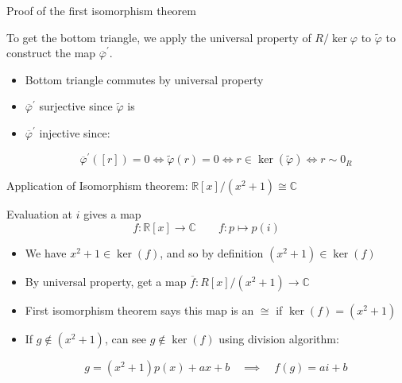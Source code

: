 \documentclass{beamer}
\newcommand{\C}{\mathbb{C}}
\newcommand{\R}{\mathbb{R}}
\begin{document}
\begin{frame}[fragile]{Proof of the first isomorphism theorem}
\begin{center}
\end{center}
To get the bottom triangle, we apply the universal property of $R/\ker{\varphi}$ to $\tilde{\varphi}$ to construct the map $\overline{\varphi}^\prime$.

\begin{itemize}
\item Bottom triangle commutes by universal property
\item $\overline{\varphi}^\prime$ surjective since $\tilde{\varphi}$ is
\item $\overline{\varphi}^\prime$ injective since:
 

$$\overline{\varphi}^\prime([r])=0\iff \tilde{\varphi}(r)=0\iff r\in \ker(\tilde{\varphi})\iff r\sim 0_R$$

\end{itemize}


\end{frame}



\begin{frame}{Application of Isomorphism theorem: $\R[x]/(x^2+1)\cong\C$}

Evaluation at $i$ gives a map 
$$f:\R[x]\to \C\quad \quad f:p\mapsto p(i)$$
\begin{itemize}
\item We have $x^2+1\in\ker(f)$, and so by definition $(x^2+1)\in\ker(f)$
\item By universal property, get a map $\overline{f}:R[x]/(x^2+1)\to\C$
\item First isomorphism theorem says this map is an $\cong$ if $\ker(f)=(x^2+1)$
\item If $g\notin (x^2+1)$, can see $g\notin \ker(f)$ using division algorithm:

$$g=(x^2+1)p(x)+ax+b\quad \implies\quad f(g)=ai+b $$


\end{itemize}


\end{frame}
\end{document}
